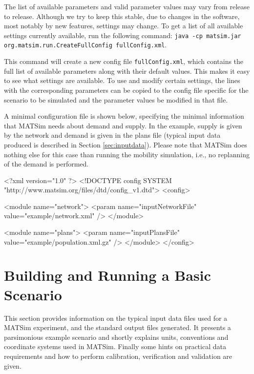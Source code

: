 The list of available parameters and valid parameter values may vary from release to release. Although we try to keep this stable, due to changes in the software, most notably by new features, settings may change. To get a list of all available settings currently available, run the following command: \lstinline|java -cp matsim.jar org.matsim.run.CreateFullConfig fullConfig.xml|.

This command will create a new config file \lstinline|fullConfig.xml|, which contains the full list of available parameters along with their default values. This makes it easy to see what settings are available. To use and modify certain settings, the lines with the corresponding parameters can be copied to the config file specific for the scenario to be simulated and the parameter values be modified in that file. 

A minimal configuration file is shown below, specifying the minimal information that MATSim needs about demand and supply. In the example, supply is given by the network and demand is given in the plans file (typical input data produced is described in Section \ref{sec:inputdata}). Please note that MATSim does nothing else for this case than running the mobility simulation, i.e., no replanning of the demand is performed.

\begin{xml}
<?xml version="1.0" ?> 
<!DOCTYPE config SYSTEM "http://www.matsim.org/files/dtd/config_v1.dtd"> 
<config> 
 
   <module name="network"> 
      <param name="inputNetworkFile" value="example/network.xml" /> 
   </module> 
 
   <module name="plans"> 
      <param name="inputPlansFile" value="example/population.xml.gz" /> 
   </module> 
</config>
\end{xml}

\section{Building and Running a Basic Scenario}
\label{sec:buildingbasicscenario}
This section provides information on the typical input data files used for a MATSim experiment, and the standard output files generated. It presents a parsimonious example scenario and shortly explains units, conventions and coordinate systems used in MATSim. Finally some hints on practical data requirements and how to perform calibration, verification and validation are given.

